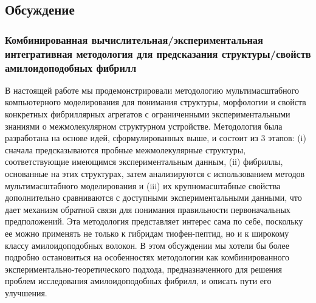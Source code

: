 \subsection{Обсуждение}

\subsubsection{Комбинированная вычислительная/экспериментальная интегративная методология для предсказания структуры/свойств амилоидоподобных фибрилл}

    В настоящей работе мы продемонстрировали методологию мультимасштабного компьютерного моделирования для понимания структуры, морфологии и свойств конкретных фибриллярных агрегатов с ограниченными экспериментальными знаниями о межмолекулярном структурном устройстве. Методология была разработана на основе идей, сформулированных выше, и состоит из 3 этапов: (i) сначала предсказываются пробные межмолекулярные структуры, соответствующие имеющимся экспериментальным данным, (ii) фибриллы, основанные на этих структурах, затем анализируются с использованием методов мультимасштабного моделирования и (iii) их крупномасштабные свойства дополнительно сравниваются с доступными экспериментальными данными, что дает механизм обратной связи для понимания правильности первоначальных предположений. Эта методология представляет интерес сама по себе, поскольку ее можно применять не только к гибридам тиофен-пептид, но и к широкому классу амилоидоподобных волокон. В этом обсуждении мы хотели бы более подробно остановиться на особенностях методологии как комбинированного экспериментально-теоретического подхода, предназначенного для решения проблем исследования амилоидоподобных фибрилл, и описать пути его улучшения.

